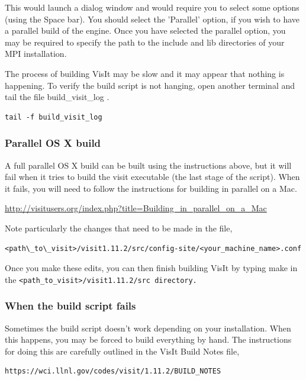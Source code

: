 \documentclass[12pt]{article}
\begin{document}
This would launch a dialog window and would require you to select some
options (using the Space bar). You should select the 'Parallel'
option, if you wish to have a parallel build of the engine. Once you
have selected the parallel option, you may be required to specify the
path to the include and lib directories of your MPI installation.

The process of building VisIt may be slow and it may appear that
nothing is happening. To verify the build script is not hanging, open
another terminal and tail the file build\_visit\_log .

\begin{verbatim}
tail -f build_visit_log
\end{verbatim}

\normalfont  
\subsubsection{Parallel OS X build}
\label{sec:ParallelOSXBuild}

A full parallel OS X build can be built using the instructions above,
but it will fail when it tries to build the visit executable (the last
stage of the script). When it fails, you will need to follow the
instructions for building in parallel on a Mac.

\url{http://visitusers.org/index.php?title=Building_in_parallel_on_a_Mac}

  
Note particularly the changes that need to be made in the file, 

\begin{verbatim}
<path\_to\_visit>/visit1.11.2/src/config-site/<your_machine_name>.conf
\end{verbatim}

\normalfont Once you make these edits, you can then finish building VisIt by typing make in the \tt <path\_to\_visit>/visit1.11.2/src \normalfont directory.  

\subsubsection{When the build script fails}
\label{sec:WhenTheBuildsSriptFails}

Sometimes the build script doesn't work depending on your
installation. When this happens, you may be forced to build everything
by hand. The instructions for doing this are carefully outlined in the
VisIt Build Notes file,

\begin{verbatim}
https://wci.llnl.gov/codes/visit/1.11.2/BUILD_NOTES
\end{verbatim}
\end{document}
